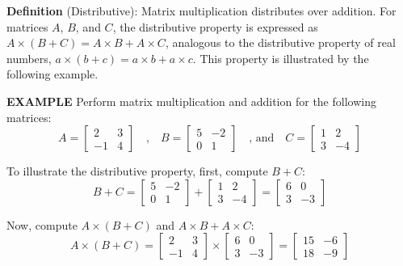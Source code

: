 \documentclass{report}
\begin{document}
\noindent \textbf{Definition }(Distributive):
Matrix multiplication distributes over addition. For matrices \( A \), \( B \), and \( C \), the distributive property is expressed as \( A \times (B + C) = A \times B + A \times C \), analogous to the distributive property of real numbers, \( a \times (b + c) = a \times b + a \times c \). This property is illustrated by the following example.\\
\begin{tcolorbox}[colback=gray!10, boxrule=0pt]
\textbf{EXAMPLE}
Perform matrix multiplication and addition for the following matrices:
\[
A = \begin{bmatrix}
2 & 3 \\
-1 & 4
\end{bmatrix}
\quad \text{,} \quad
B = \begin{bmatrix}
5 & -2 \\
0 & 1
\end{bmatrix}
\quad \text{, and} \quad
C = \begin{bmatrix}
1 & 2 \\
3 & -4
\end{bmatrix}
\]

To illustrate the distributive property, first, compute \( B + C \):
\[
B + C = \begin{bmatrix}
5 & -2 \\
0 & 1
\end{bmatrix}
+
\begin{bmatrix}
1 & 2 \\
3 & -4
\end{bmatrix}
=
\begin{bmatrix}
6 & 0 \\
3 & -3
\end{bmatrix}
\]

Now, compute \( A \times (B + C) \) and \( A \times B + A \times C \):
\[
A \times (B + C) = 
\begin{bmatrix}
2 & 3 \\
-1 & 4
\end{bmatrix}
\times
\begin{bmatrix}
6 & 0 \\
3 & -3
\end{bmatrix}
=
\begin{bmatrix}
15 & -6 \\
18 & -9
\end{bmatrix}
\]


\end{tcolorbox}
\end{document}
